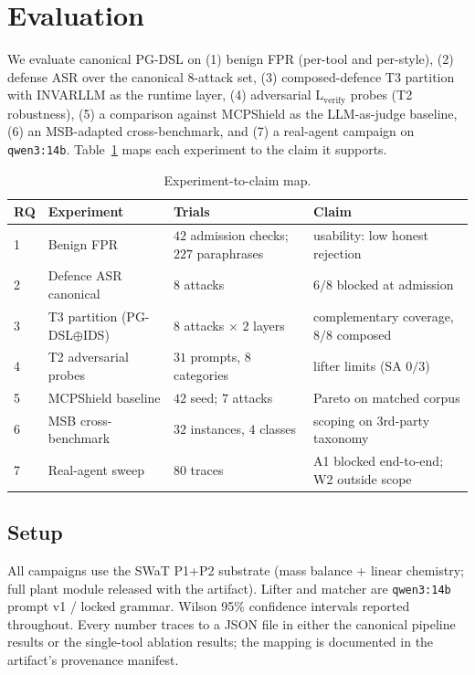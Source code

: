\section{Evaluation}
\label{sec:eval}

We evaluate canonical PG-DSL on (1) benign FPR (per-tool and
per-style), (2) defense ASR over the canonical 8-attack set, (3)
composed-defence T3 partition with INVARLLM as the runtime layer, (4)
adversarial L${}_{\text{verify}}$ probes (T2 robustness), (5)
a comparison against MCPShield as the LLM-as-judge baseline,
(6) an MSB-adapted cross-benchmark, and (7) a real-agent campaign
on \texttt{qwen3:14b}. Table~\ref{tbl:rq-map} maps each experiment
to the claim it supports.

\begin{table}[t]
\centering
\footnotesize
\caption{Experiment-to-claim map.}
\label{tbl:rq-map}
\begin{tabular}{@{}p{}p{}p{}p{}@{}}
\toprule
RQ & Experiment & Trials & Claim \\
\midrule
1 & Benign FPR & $42$ admission checks; $227$ paraphrases & usability: low honest rejection \\
2 & Defence ASR canonical & $8$ attacks & $6/8$ blocked at admission \\
3 & T3 partition (PG-DSL$\oplus$IDS) & $8$ attacks $\times$ $2$ layers & complementary coverage, $8/8$ composed \\
4 & T2 adversarial probes & $31$ prompts, $8$ categories & lifter limits (SA $0/3$) \\
5 & MCPShield baseline & $42$ seed; $7$ attacks & Pareto on matched corpus \\
6 & MSB cross-benchmark & $32$ instances, $4$ classes & scoping on 3rd-party taxonomy \\
7 & Real-agent sweep & $80$ traces & A1 blocked end-to-end; W2 outside scope \\
\bottomrule
\end{tabular}
\end{table}

\subsection{Setup}

All campaigns use the SWaT P1+P2 substrate (mass balance + linear
chemistry; full plant module released with the artifact). Lifter and
matcher are \texttt{qwen3:14b} prompt v1 / locked grammar. Wilson
95\% confidence intervals reported throughout. Every number traces
to a JSON file in either the canonical pipeline results or the
single-tool ablation results; the mapping is documented in the
artifact's provenance manifest.


